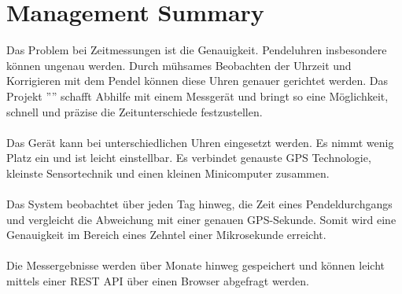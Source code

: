 \section{Management Summary}
Das Problem bei Zeitmessungen ist die Genauigkeit. Pendeluhren insbesondere können ungenau werden.
Durch mühsames Beobachten der Uhrzeit und Korrigieren mit dem Pendel können diese Uhren genauer gerichtet werden.
Das Projekt ''\documenttitle'' schafft Abhilfe mit einem Messgerät und bringt so eine Möglichkeit, schnell und präzise die Zeitunterschiede festzustellen.\\
\\
Das Gerät kann bei unterschiedlichen Uhren eingesetzt werden. Es nimmt wenig Platz ein und ist leicht einstellbar. Es verbindet genauste GPS Technologie, kleinste Sensortechnik und einen kleinen Minicomputer zusammen.\\
\\
Das System beobachtet über jeden Tag hinweg, die Zeit eines Pendeldurchgangs und vergleicht die Abweichung mit einer genauen GPS-Sekunde. Somit wird eine Genauigkeit im Bereich eines Zehntel einer Mikrosekunde erreicht.\\
\\
Die Messergebnisse werden über Monate hinweg gespeichert und können leicht mittels einer REST API über einen Browser abgefragt werden.